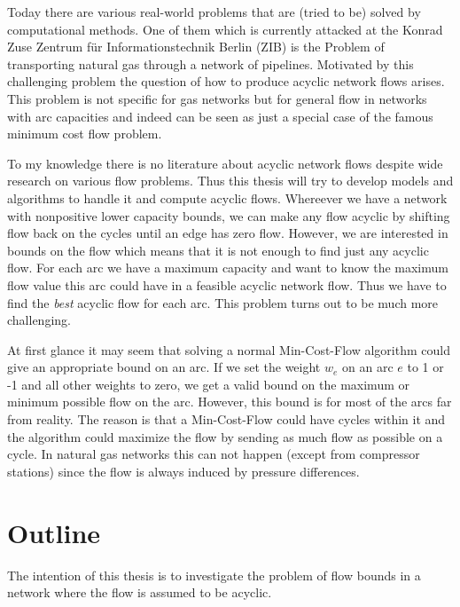 
Today there are various real-world problems that are (tried to be) solved by computational methods. One of them which 
is currently attacked at the Konrad Zuse Zentrum für Informationstechnik Berlin (ZIB) is the Problem of transporting 
natural gas through a network of pipelines. Motivated by this challenging problem the question of how to produce 
acyclic network flows arises. This problem is not specific for gas networks but for general flow in networks with arc 
capacities and indeed can be seen as just a special case of the famous minimum cost flow problem. 

To my knowledge there is no literature about acyclic network flows despite wide research on various flow problems. 
Thus this thesis will try to develop models and algorithms to handle it and compute acyclic flows.
Whereever we have a network with nonpositive lower capacity bounds, we can make any flow acyclic by shifting flow 
back on the cycles until an edge has zero flow. 
However, we are interested in bounds on the flow which means that it is not enough to find just any acyclic flow. 
For each arc we have a maximum 
capacity and want to know the maximum flow value this arc could have in a feasible acyclic network flow. Thus 
we have to find the \textit{best} acyclic flow for each arc. This problem turns out to be much more challenging.


At first glance it may seem that solving a normal Min-Cost-Flow algorithm could give an appropriate bound 
on an arc. If we set the weight $w_e$ on an arc $e$ to 1 or -1 and all other weights to zero, we get 
a valid bound on the maximum or minimum possible flow on the arc. However, this bound is for most of the arcs far from 
reality. The reason is that a Min-Cost-Flow could have cycles within it and the algorithm could maximize the flow by 
sending as much flow as possible on a cycle. In natural gas networks this can not happen (except from compressor 
stations) since the flow is always induced by pressure differences.\\

\section{Outline}
The intention of this thesis is to investigate the problem of flow bounds in a network where the flow is assumed to be 
acyclic. 

